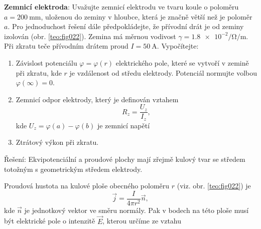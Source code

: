 \begin{mdframed}[style=mdexam]
  \begin{example}\label{TEO:exam011}
    \textbf{Zemnicí elektroda}: Uvažujte zemnicí elektrodu ve tvaru koule o poloměru
    $a=\qty{200}{\mm}$, uloženou do zeminy v hloubce, která je značně větší než je poloměr $a$. Pro
    jednoduchost řešení dále předpokládejte, že přívodní drát je od zeminy izolován (obr.
    \ref{teo:fig022}). Zemina má měrnou vodivost $\gamma=\num[exponent-product =
    \cdot]{1,8e-2}\unit{\per\ohm\per\m}$. Při zkratu teče přívodním drátem proud $I=\qty{50}{\A}$.
    Vypočítejte:




    \begin{enumerate}[label=\emph{\alph*}),noitemsep]
      \item Závislost potenciálu $\varphi=\varphi(r)$ elektrického pole, které se vytvoří v
            zemině při zkratu, kde $r$ je vzdálenost od středu elektrody. Potenciál normujte
            volbou $\varphi(\infty)=0$.
      \item Zemnicí odpor elektrody, který je definován vztahem
            $$R_z=\frac{U_z}{I_z},$$ kde $U_z = \varphi(a)-\varphi(b)$ je zemnicí napětí 
      \item Ztrátový výkon při zkratu.
    \end{enumerate}
    Řešení: Ekvipotenciální a proudové plochy mají zřejmě kulový tvar se středem totožným s
    geometrickým středem elektrody. 

    {\centering
    \captionsetup{type=figure}
    \label{teo:fig022}
    \par}


    Proudová hustota na kulové ploše obecného poloměru $r$ (viz. obr. \ref{teo:fig022}) je
    $$\vec{j}=\frac{I}{4\pi r^2}\vec{n},$$ kde $\vec{n}$ je jednotkový vektor ve směru normály. Pak
    v bodech na této ploše musí být elektrické pole o intenzitě $\vec{E}$, kterou určíme ze vztahu


\end{example}
\end{mdframed}
